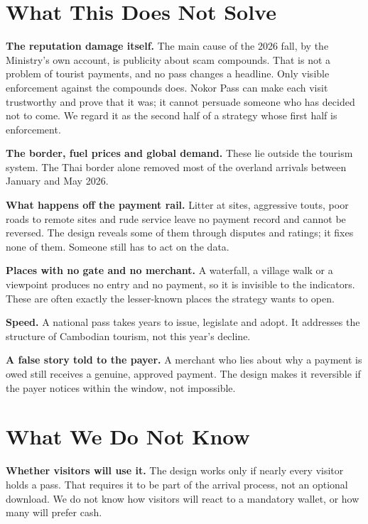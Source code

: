 \documentclass[10pt,letterpaper,twocolumn]{article}
\newcommand{\runin}[1]{\textbf{#1}\quad}
\begin{document}
\section{What This Does Not Solve}
\label{sec:notsolve}

\runin{The reputation damage itself.} The main cause of the 2026 fall, by the
Ministry's own account, is publicity about scam compounds. That is not a
problem of tourist payments, and no pass changes a headline. Only visible
enforcement against the compounds does. Nokor Pass can make each visit
trustworthy and prove that it was; it cannot persuade someone who has decided
not to come. We regard it as the second half of a strategy whose first half is
enforcement.

\runin{The border, fuel prices and global demand.} These lie outside the
tourism system. The Thai border alone removed most of the overland arrivals
between January and May 2026.

\runin{What happens off the payment rail.} Litter at sites, aggressive touts,
poor roads to remote sites and rude service leave no payment record and cannot
be reversed. The design reveals some of them through disputes and ratings; it
fixes none of them. Someone still has to act on the data.

\runin{Places with no gate and no merchant.} A waterfall, a village walk or a
viewpoint produces no entry and no payment, so it is invisible to the
indicators. These are often exactly the lesser-known places the strategy wants
to open.

\runin{Speed.} A national pass takes years to issue, legislate and adopt. It
addresses the structure of Cambodian tourism, not this year's decline.

\runin{A false story told to the payer.} A merchant who lies about why a
payment is owed still receives a genuine, approved payment. The design makes it
reversible if the payer notices within the window, not impossible.

\section{What We Do Not Know}
\label{sec:unknown}

\runin{Whether visitors will use it.} The design works only if nearly every
visitor holds a pass. That requires it to be part of the arrival process, not
an optional download. We do not know how visitors will react to a mandatory
wallet, or how many will prefer cash.
\end{document}
